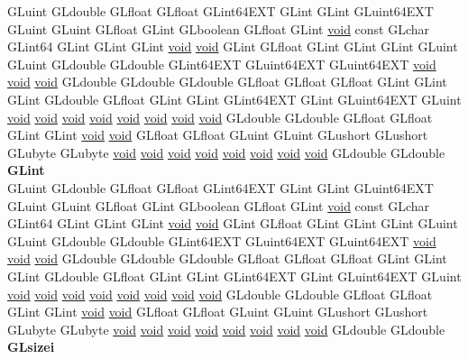 \begin{DoxyCompactItemize}
\begin{tabbing}
\>GLuint GLdouble GLfloat GLfloat GLint64EXT GLint GLint GLuint64EXT GLuint GLuint GLfloat GLint GLboolean GLfloat GLint \hyperlink{interfacevoid}{void} const GLchar GLint64 GLint GLint GLint \hyperlink{interfacevoid}{void} \hyperlink{interfacevoid}{void} GLint GLfloat GLint GLint GLint GLuint GLuint GLdouble GLdouble GLint64EXT GLuint64EXT GLuint64EXT \hyperlink{interfacevoid}{void} \hyperlink{interfacevoid}{void} \hyperlink{interfacevoid}{void} GLdouble GLdouble GLdouble GLfloat GLfloat GLfloat GLint GLint GLint GLdouble GLfloat GLint GLint GLint64EXT GLint GLuint64EXT GLuint \hyperlink{interfacevoid}{void} \hyperlink{interfacevoid}{void} \hyperlink{interfacevoid}{void} \hyperlink{interfacevoid}{void} \hyperlink{interfacevoid}{void} \hyperlink{interfacevoid}{void} \hyperlink{interfacevoid}{void} \hyperlink{interfacevoid}{void} GLdouble GLdouble GLfloat GLfloat GLint GLint \hyperlink{interfacevoid}{void} \hyperlink{interfacevoid}{void} GLfloat GLfloat GLuint GLuint GLushort GLushort GLubyte GLubyte \hyperlink{interfacevoid}{void} \hyperlink{interfacevoid}{void} \hyperlink{interfacevoid}{void} \hyperlink{interfacevoid}{void} \hyperlink{interfacevoid}{void} \hyperlink{interfacevoid}{void} \hyperlink{interfacevoid}{void} \hyperlink{interfacevoid}{void} GLdouble GLdouble {\bfseries GLint}\\
\>GLuint GLdouble GLfloat GLfloat GLint64EXT GLint GLint GLuint64EXT GLuint GLuint GLfloat GLint GLboolean GLfloat GLint \hyperlink{interfacevoid}{void} const GLchar GLint64 GLint GLint GLint \hyperlink{interfacevoid}{void} \hyperlink{interfacevoid}{void} GLint GLfloat GLint GLint GLint GLuint GLuint GLdouble GLdouble GLint64EXT GLuint64EXT GLuint64EXT \hyperlink{interfacevoid}{void} \hyperlink{interfacevoid}{void} \hyperlink{interfacevoid}{void} GLdouble GLdouble GLdouble GLfloat GLfloat GLfloat GLint GLint GLint GLdouble GLfloat GLint GLint GLint64EXT GLint GLuint64EXT GLuint \hyperlink{interfacevoid}{void} \hyperlink{interfacevoid}{void} \hyperlink{interfacevoid}{void} \hyperlink{interfacevoid}{void} \hyperlink{interfacevoid}{void} \hyperlink{interfacevoid}{void} \hyperlink{interfacevoid}{void} \hyperlink{interfacevoid}{void} GLdouble GLdouble GLfloat GLfloat GLint GLint \hyperlink{interfacevoid}{void} \hyperlink{interfacevoid}{void} GLfloat GLfloat GLuint GLuint GLushort GLushort GLubyte GLubyte \hyperlink{interfacevoid}{void} \hyperlink{interfacevoid}{void} \hyperlink{interfacevoid}{void} \hyperlink{interfacevoid}{void} \hyperlink{interfacevoid}{void} \hyperlink{interfacevoid}{void} \hyperlink{interfacevoid}{void} \hyperlink{interfacevoid}{void} GLdouble GLdouble {\bfseries GLsizei}\\

\end{tabbing}
\end{DoxyCompactItemize}

